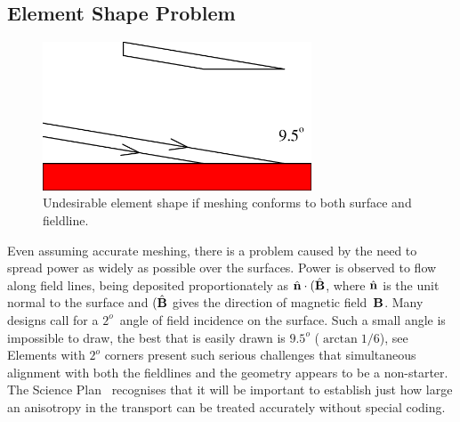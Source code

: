 \subsection{Element Shape Problem} \label{sec:eltprob}
\begin{figure}
\centerline{\includegraphics[width=8cm]{../png/9p5deg}}
\caption{Undesirable element shape if meshing conforms to both surface and fieldline.\label{fig:9p5deg}}
\end{figure}

Even assuming accurate meshing, there is a problem caused by the need to spread power
as widely as possible over the surfaces. Power is observed to flow along field lines, being
deposited proportionately as $\hat{\bf n}\cdot(\hat{\bf B}$, where  $\hat{\bf n}$ is
the unit normal to the surface and $(\hat{\bf B}$ gives
the direction of magnetic field~${\bf B}$.
Many designs call for a $2^o$~angle of field incidence on the surface. Such a small angle
is impossible to draw, the best that
is easily drawn is $9.5^o$ ($\arctan 1/6$), see  Elements with $2^o$ corners present such serious
challenges that simultaneous alignment with both the fieldlines and the geometry appears
to be a non-starter. The Science Plan~\cite{sciplan} recognises that it will be important to establish just
how large an anisotropy in the transport can be treated accurately without special coding.


